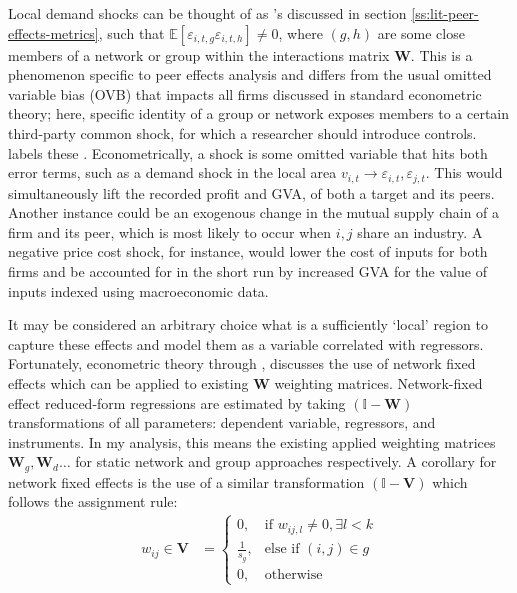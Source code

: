 Local demand shocks can be thought of as \cite{Manski1993}'s 
discussed in section \ref{ss:lit-peer-effects-metrics}, such that
$\mathbb E[\varepsilon_{i,t,g}\varepsilon_{i,t,h}]\neq 0$,
where $(g,h)$ are some close members of a network or group within the interactions matrix $\mathbf W$.
This is a phenomenon specific to peer effects analysis
and differs from the usual omitted variable bias (OVB)
that impacts all firms discussed in standard econometric theory;
here, specific identity of a group or network exposes members to a certain third-party common shock,
for which a researcher should introduce controls.
\cite{Manski1993} labels these .
Econometrically, a  shock is some omitted variable that hits both error terms,
such as a demand shock in the local area $v_{i,t}\to \varepsilon_{i,t},\varepsilon_{j,t}$.
This would simultaneously lift the recorded profit and GVA,
of both a target and its peers.
Another instance could be an exogenous change in the mutual supply chain of a firm and its peer,
which is most likely to occur when $i,j$ share an industry.
A negative price cost shock, for instance, would lower the cost of inputs for both firms
and be accounted for in the short run by increased GVA
for the value of inputs indexed using macroeconomic data.
\par
It may be considered an arbitrary choice what is a sufficiently `local' region
to capture these effects and model them as a variable correlated with regressors.
Fortunately, econometric theory through \cite{Bramoulle2009},
discusses the use of  network fixed effects
which can be applied to existing $\mathbf{W}$ weighting matrices.
Network-fixed effect reduced-form regressions are estimated
by taking $(\mathbb I-\mathbf W)$ transformations of all parameters:
dependent variable, regressors, and instruments.
In my analysis, this means the existing applied weighting matrices $\mathbf W_g, \mathbf W_d\dots$
for static network and group approaches respectively.
A corollary for  network fixed effects
is the use of a similar transformation $(\mathbb I - \mathbf V)$ which follows the assignment rule:
\begin{align*}
    w_{ij}\in \mathbf{V} &=
    \begin{cases}
        0,             & \text{if } w_{ij,l} \neq 0, \exists l<k \\
        \frac{1}{s_g}, & \text{else if } (i,j)\in g \\
        0,             & \text{otherwise}
    \end{cases}
\end{align*}
